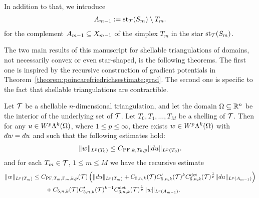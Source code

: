 \documentclass[10pt,a4paper]{article}
\begin{document}
In addition to that, we introduce 
\begin{align*}
    A_{m-1} := \operatorname{st}_{{\mathcal T}}(S_{m}) \setminus T_{m}.
\end{align*}
for the complement $A_{m-1} \subseteq X_{m-1}$ of the simplex $T_{m}$ in the star $\operatorname{st}_{{\mathcal T}}(S_{m})$. 

The two main results of this manuscript for shellable triangulations of domains, not necessarily convex or even star-shaped, is the following theorems. 
The first one is inspired by the recursive construction of gradient potentials in Theorem~\ref{theorem:poincarefriedrichsestimate:grad}.
The second one is specific to the fact that shellable triangulations are contractible.




\begin{theorem}\label{theorem:poincarefriedrichsestimate:exterior}
    Let ${\mathcal T}$ be a shellable $n$-dimensional triangulation, and let the domain $\Omega \subseteq {\mathbb R}^{n}$ be the interior of the underlying set of ${\mathcal T}$.
    Let $T_0, T_1, \dots, T_M$ be a shelling of ${\mathcal T}$.
    Then for any $u \in W^{p}\Lambda^{k}(\Omega)$, where $1 \leq p \leq \infty$, 
    there exists $w \in W^{p}\Lambda^{k}(\Omega)$ with $d w = d u$
    and such that the following estimates hold:
    \begin{gather*}
        \| w \|_{L^{p}(T_{0})} \leq C_{{{\rm PF}},k,T_{0},p} \| d u \|_{L^{p}(T_{0})}.
    \end{gather*}
    and for each $T_{m} \in {\mathcal T}$, $1 \leq m \leq M$ we have the recursive estimate 
    \begin{align*}
        \| w \|_{L^{p}(T_{m})}
        &
        \leq  
        C_{{\rm PF},T_{m},\Gamma_{m},k,p}({\mathcal T}) 
        \left( 
            \| d u      \|_{L^{p}(T_{m})} 
            +
            C_{5,n,k}({\mathcal T})
            C'_{5,n,k}({\mathcal T})^{k} 
            C^{\det}_{6,n,k}({\mathcal T})^{\frac 1 p} 
            \| d u \|_{L^{p}(A_{m-1})}
        \right)
        \\&\qquad
        + 
        C_{5,n,k}({\mathcal T}) 
        C'_{5,n,k}({\mathcal T})^{k-1} 
        C^{\det}_{6,n,k}({\mathcal T})^{\frac 1 p} 
        \| w \|_{L^{p}(A_{m-1})}
        .
    \end{align*}
\end{theorem}
\end{document}
